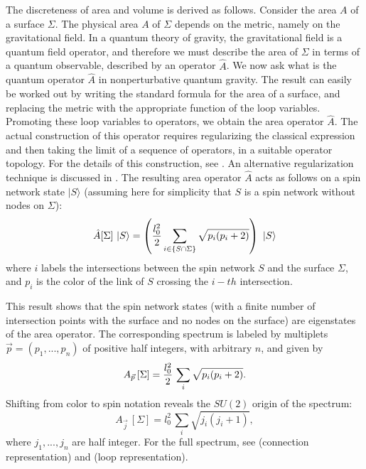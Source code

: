 \begin{itemize}
\begin{itemize}
\end{itemize}

 The discreteness of area and volume is derived as follows.  Consider 
 the area $A$ of a surface $\Sigma$.  The physical area $A$ of 
 $\Sigma$ depends on the metric, namely on the gravitational field.  
 In a quantum theory of gravity, the gravitational field is a quantum 
 field operator, and therefore we must describe the area of $\Sigma$ 
 in terms of a quantum observable, described by an operator $\hat A$.  
 We now ask what is the quantum operator $\hat A$ in nonperturbative 
 quantum gravity.  The result can easily be worked out by writing the 
 standard formula for the area of a surface, and replacing the metric 
 with the appropriate function of the loop variables.  Promoting these 
 loop variables to operators, we obtain the area operator $\hat A$.  
 The actual construction of this operator requires regularizing the 
 classical expression and then taking the limit of a sequence of 
 operators, in a suitable operator topology.  For the details of this 
 construction, see 
 \cite{RovelliSmolin95,DePietriRovelli,FrittelliEtAl,BorissovEtAl97}.  
 An alternative regularization technique is discussed in 
 \cite{AshtekarLewandowskiArea2}.  The resulting area operator $\hat 
 A$ acts as follows on a spin network state $|S\rangle$ (assuming here 
 for simplicity that $S$ is a spin network without nodes on $\Sigma$):
\begin{equation}
\hat{A}[\Sigma]\ |S\rangle=
\left({l^2_0\over 2} \sum_{i\in\{S\cap\Sigma\}}
\sqrt{p_i(p_i+2)}\right) \  |S\rangle
\end{equation}
where $i$ labels the intersections between the spin network $S$ 
and the surface $\Sigma$, and $p_{i}$ is the color of the link of 
$S$ crossing the $i-th$ intersection.

This result shows that the spin network states (with
a finite number of intersection points with the surface
and no nodes on the surface) are eigenstates of the
area operator. The corresponding spectrum is labeled by
multiplets  $\vec p = (p_1, ..., p_n)$ of positive half
integers, with arbitrary $n$, and given by
\begin{equation}
   A_{\vec p}\,[\Sigma] = {l^2_0\over 2} \, \sum_i  
   \sqrt{p_i(p_i+2)}.
\end{equation}
Shifting from color to spin notation reveals the $SU(2)$ origin
of the spectrum:
\begin{equation}
   A_{\vec j}\,[\Sigma] = l^2_0 \, \sum_i  \sqrt{j_i(j_i+1)},
\label{spec}
\end{equation}
where $j_1, ..., j_n$ are half integer.  For the full spectrum, 
see \cite{AshtekarLewandowskiArea2} (connection representation) 
and \cite{FrittelliEtAl} (loop representation).


\end{itemize}
